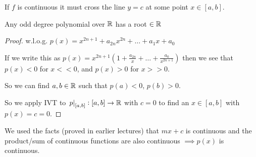 If $f$ is continuous it must cross the line $y=c$ at some point $x \in [a,b]$. 

\begin{corollary}
Any odd degree polynomial over $\mathbb{R}$ has a root $\in\mathbb{R}$	
\end{corollary}
\begin{proof}
w.l.o.g. $p(x) = x^{2n+1} + a_{2n}x^{2n} + \dots + a_1x + a_0$

If we write this as $p(x) = x^{2n+1}(1 + \frac{a_{2n}}{x} + \dots + \frac{a_0}{x^{2n+1}})$ then we see that $p(x) < 0$ for $x << 0$, and $p(x) > 0$ for $x>>0$. 

So we can find $a,b \in\mathbb{R}$ such that $p(a) < 0$,  $p(b) > 0$. 

So we apply IVT to $\left.p\right|_{[a,b]}: [a,b] \to \mathbb{R}$ with $c = 0$ to find an $x \in [a,b]$ with $p(x) = c = 0$.
\end{proof}

We used the facts (proved in earlier lectures) that $mx +c$ is continuous and the product/sum of continuous functions are also continuous $\implies p(x)$ is continuous. 

